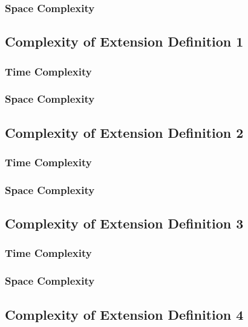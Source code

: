 \documentclass[conference]{IEEEtran}
\begin{document}
\subsubsection{Space Complexity}

\subsection{Complexity of Extension Definition 1}

\subsubsection{Time Complexity}

\subsubsection{Space Complexity}

\subsection{Complexity of Extension Definition 2}

\subsubsection{Time Complexity}

\subsubsection{Space Complexity}

\subsection{Complexity of Extension Definition 3}

\subsubsection{Time Complexity}

\subsubsection{Space Complexity}

\subsection{Complexity of Extension Definition 4}
\end{document}
